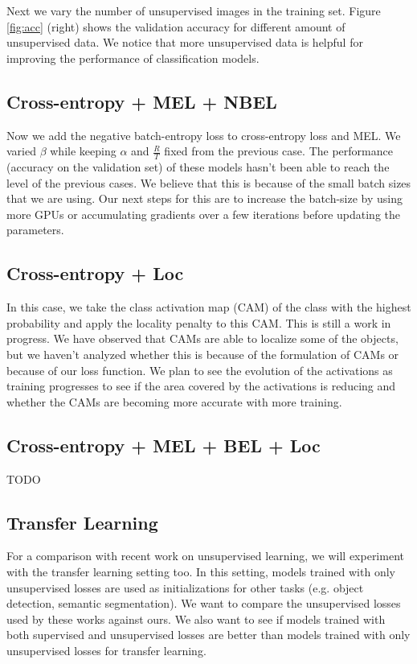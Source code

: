 \documentclass[runningheads]{llncs}
\begin{document}
Next we vary the number of unsupervised images in the training set. Figure \ref{fig:acc} (right)
shows the validation accuracy for different amount of unsupervised data. We notice that more
unsupervised data is helpful for improving the performance of classification models. 

\subsection{Cross-entropy + MEL + NBEL}
Now we add the negative batch-entropy loss to cross-entropy loss and MEL. We varied $\beta$ while
keeping $\alpha$ and $\frac{R}{T}$ fixed from the previous case. The performance (accuracy on the
validation set) of these models hasn't been able to reach the level of the previous cases. We
believe that this is because of the small batch sizes that we are using. Our next steps for this are
to increase the batch-size by using more GPUs or accumulating gradients over a few iterations before
updating the parameters.

\subsection{Cross-entropy + Loc}
In this case, we take the class activation map (CAM) of the class with the highest probability and
apply the locality penalty to this CAM. This is still a work in progress. We have observed that CAMs
are able to localize some of the objects, but we haven't analyzed whether this is because of the
formulation of CAMs or because of our loss function. We plan to see the evolution of the
activations as training progresses to see if the area covered by the activations is reducing and
whether the CAMs are becoming more accurate with more training. 

\subsection{Cross-entropy + MEL + BEL + Loc}
TODO

\subsection{Transfer Learning}
For a comparison with recent work on unsupervised learning, we will experiment
with the transfer learning setting too. In this setting, models trained with only unsupervised
losses are used as initializations for other tasks (e.g. object detection, semantic segmentation).
We want to compare the unsupervised losses used by these works against ours. We also want to see if
models trained with both supervised and unsupervised losses are better than models trained with only
unsupervised losses for transfer learning. 



\end{document}
